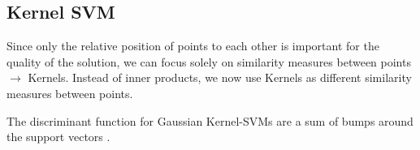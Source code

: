 \documentclass[../main.tex]{subfiles}
\begin{document}
\subsection{Kernel SVM} 
\attention Since only the relative position of points to each other is important for the quality of the solution, we can focus solely on similarity measures between points $\rightarrow$ Kernels. 
Instead of inner products, we now use Kernels as different similarity measures between points. 

\attention The discriminant function for Gaussian Kernel-SVMs are a sum of bumps around the support vectors .  %
\end{document}
